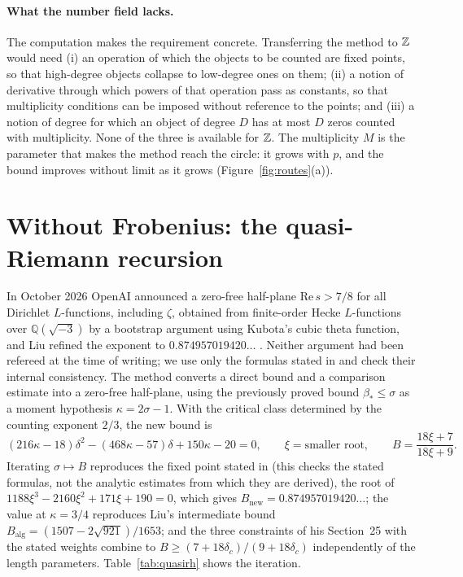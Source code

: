 \documentclass[11pt,a4paper]{article}
\theoremstyle{definition}\newtheorem{definition}[proposition]{Definition}
\theoremstyle{remark}\newtheorem{remark}[proposition]{Remark}
\begin{document}
\paragraph{What the number field lacks.} The computation makes the requirement concrete. Transferring the method to $\mathbb Z$ would need (i) an operation of which the objects to be counted are fixed points, so that high-degree objects collapse to low-degree ones on them; (ii) a notion of derivative through which powers of that operation pass as constants, so that multiplicity conditions can be imposed without reference to the points; and (iii) a notion of degree for which an object of degree $D$ has at most $D$ zeros counted with multiplicity. None of the three is available for $\mathbb Z$. The multiplicity $M$ is the parameter that makes the method reach the circle: it grows with $p$, and the bound improves without limit as it grows (Figure~\ref{fig:routes}(a)).

\section{Without Frobenius: the quasi-Riemann recursion}\label{sec:quasirh}
In October 2026 OpenAI announced a zero-free half-plane $\mathrm{Re}\,s>7/8$ for all Dirichlet $L$-functions, including $\zeta$, obtained from finite-order Hecke $L$-functions over $\mathbb Q(\sqrt{-3})$ by a bootstrap argument using Kubota's cubic theta function, and Liu refined the exponent to $0.874957019420\ldots$ \cite{Liu2026}. Neither argument had been refereed at the time of writing; we use only the formulas stated in \cite{Liu2026} and check their internal consistency. The method converts a direct bound and a comparison estimate into a zero-free half-plane, using the previously proved bound $\beta_*\le\sigma$ as a moment hypothesis $\kappa=2\sigma-1$. With the critical class determined by the counting exponent $2/3$, the new bound is
\[
(216\kappa-18)\delta^2-(468\kappa-57)\delta+150\kappa-20=0,\qquad\xi=\text{smaller root},\qquad B=\frac{18\xi+7}{18\xi+9}.
\]
Iterating $\sigma\mapsto B$ reproduces the fixed point stated in \cite{Liu2026} (this checks the stated formulas, not the analytic estimates from which they are derived), the root of $1188\xi^3-2160\xi^2+171\xi+190=0$, which gives $B_{\mathrm{new}}=0.874957019420\ldots$; the value at $\kappa=3/4$ reproduces Liu's intermediate bound $B_{\mathrm{alg}}=(1507-2\sqrt{921})/1653$; and the three constraints of his Section~25 with the stated weights combine to $B\ge(7+18\delta_c)/(9+18\delta_c)$ independently of the length parameters. Table~\ref{tab:quasirh} shows the iteration.
\end{document}
